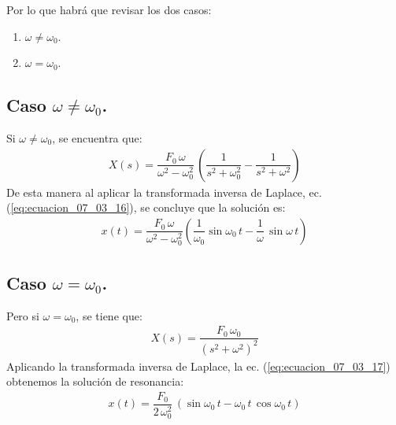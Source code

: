 Por lo que habrá que revisar los dos casos:
\begin{enumerate}
\item $\omega \neq \omega_{0}$.
\item $\omega = \omega_{0}$.
\end{enumerate}

\subsection*{Caso $\omega \neq \omega_{0}$.}

Si $\omega \neq \omega_{0}$, se encuentra que:
\begin{align*}
X(s) = \dfrac{F_{0} \, \omega}{\omega^{2} - \omega_{0}^{2}} \, \left( \dfrac{1}{s^{2}+ \omega_{0}^{2}} - \dfrac{1}{s^{2} + \omega^{2}} \right)
\end{align*}
De esta manera al aplicar la transformada inversa de Laplace, ec. (\ref{eq:ecuacion_07_03_16}), se concluye que la solución es:
\begin{align*}
x(t) = \dfrac{F_{0} \, \omega}{\omega^{2} - \omega_{0}^{2}} \left( \dfrac{1}{\omega_{0}} \sin \omega_{0} \, t - \dfrac{1}{\omega} \, \sin \omega \, t \right)
\end{align*}

\subsection*{Caso $\omega = \omega_{0}$.}

Pero si $\omega = \omega_{0}$, se tiene que:
\begin{align*}
X(s) = \dfrac{F_{0} \, \omega_{0}}{(s^{2} + \omega^{2})^{2}}
\end{align*}
Aplicando la transformada inversa de Laplace, la ec. (\ref{eq:ecuacion_07_03_17}) obtenemos la solución de resonancia:
\begin{align}
x(t) = \dfrac{F_{0}}{2 \, \omega_{0}^{2}} \, (\sin \omega_{0} \, t - \omega_{0} \, t \, \cos \omega_{0} \, t )
\label{eq:ecuacion_07_03_18}
\end{align}

